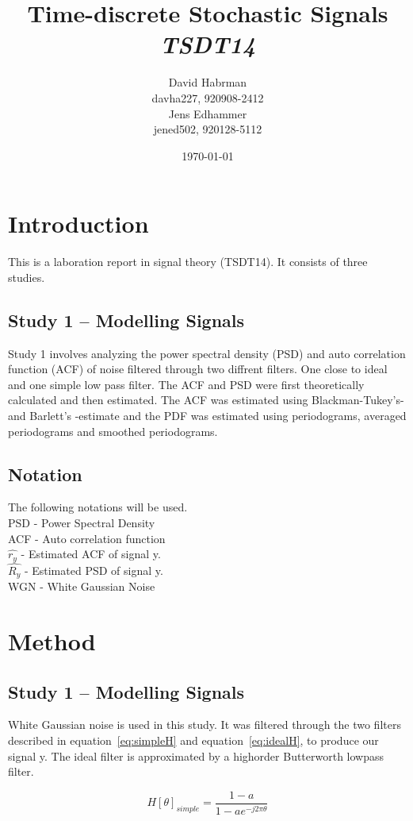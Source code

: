 \documentclass[10pt]{article}
\title{Time-discrete Stochastic Signals\\
\emph{TSDT14}}
\author{David Habrman \\ davha227, 920908-2412\\
Jens Edhammer \\ jened502, 920128-5112 }
\date{\today}
\begin{document}
\maketitle

\section{Introduction}
This is a laboration report in signal theory (TSDT14). It consists of three studies.

\subsection{Study 1 – Modelling Signals}
Study 1 involves analyzing the power spectral density (PSD) and auto correlation function (ACF)
of noise filtered through two diffrent filters. One close to ideal and one simple low pass filter.
The ACF and PSD were first theoretically calculated and then estimated.
The ACF was estimated using Blackman-Tukey's- and Barlett's -estimate and the
PDF was estimated using periodograms, averaged periodograms and smoothed periodograms.

\subsection{Notation}
The following notations will be used. \\
PSD - Power Spectral Density \\
ACF - Auto correlation function \\
$\hat{r_y}$ - Estimated ACF of signal y. \\
$\hat{R_y}$ - Estimated PSD of signal y. \\
WGN - White Gaussian Noise

\section{Method}
\subsection{Study 1 – Modelling Signals}

White Gaussian noise is used in this study. It was filtered through the two
 filters described in equation~\ref{eq:simpleH} and equation~\ref{eq:idealH},
  to produce our signal y.
 The ideal filter is approximated by a highorder Butterworth lowpass filter.

\begin{equation}
  \label{eq:simpleH}
  H[\theta]_{simple} =\frac{1-a}{1-ae^{-j2\pi\theta }}
\end{equation}
\end{document}

